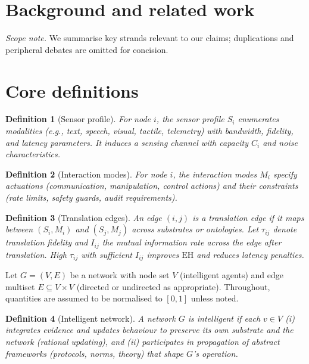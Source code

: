 \documentclass[12pt]{article}
\newcommand{\EH}{\ensuremath{\mathrm{EH}}}
\newtheorem{definition}{Definition}
\begin{document}
\section{Background and related work}
\noindent\textit{Scope note.} We summarise key strands relevant to our claims; duplications and peripheral debates are omitted for concision.


\section{Core definitions}
\begin{definition}[Sensor profile]\label{def:sensors}
For node $i$, the \emph{sensor profile} $S_i$ enumerates modalities (e.g., text, speech, visual, tactile, telemetry) with bandwidth, fidelity, and latency parameters. It induces a sensing channel with capacity $C_i$ and noise characteristics.
\end{definition}

\begin{definition}[Interaction modes]\label{def:modes}
For node $i$, the \emph{interaction modes} $M_i$ specify actuations (communication, manipulation, control actions) and their constraints (rate limits, safety guards, audit requirements).
\end{definition}

\begin{definition}[Translation edges]\label{def:translation}
An edge $(i,j)$ is a \emph{translation edge} if it maps between $(S_i,M_i)$ and $(S_j,M_j)$ across substrates or ontologies. Let $\tau_{ij}$ denote translation fidelity and $I_{ij}$ the mutual information rate across the edge after translation. High $\tau_{ij}$ with sufficient $I_{ij}$ improves $\EH$ and reduces latency penalties.
\end{definition}

Let $G=(V,E)$ be a network with node set $V$ (intelligent agents) and edge multiset $E\subseteq V\times V$ (directed or undirected as appropriate). Throughout, quantities are assumed to be normalised to $[0,1]$ unless noted.

\begin{definition}[Intelligent network]\label{def:intnet}
A network $G$ is \emph{intelligent} if each $v\in V$ (i) integrates evidence and updates behaviour to preserve its own substrate and the network (rational updating), and (ii) participates in propagation of abstract frameworks (protocols, norms, theory) that shape $G$'s operation.
\end{definition}
\end{document}
